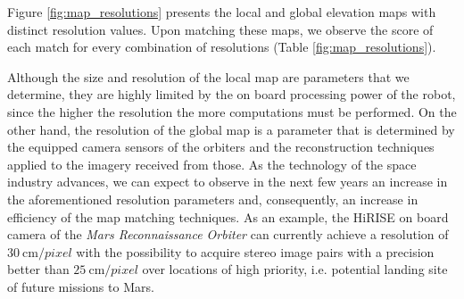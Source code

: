 Figure \ref{fig:map_resolutions} presents the local and global elevation
maps with distinct resolution values.
Upon matching these maps, we observe the score of each match for every
combination of resolutions (Table \ref{fig:map_resolutions}).

Although the size and resolution of the local map are parameters that we
determine, they are highly limited by the on board processing power of the
robot, since the higher the resolution the more computations must be performed.
On the other hand, the resolution of the global map is a parameter that is
determined by the equipped camera sensors of the orbiters and the
reconstruction techniques applied to the imagery received from those.
As the technology of the space industry advances, we can expect to observe
in the next few years an increase in the aforementioned resolution parameters
and, consequently, an increase in efficiency of the map matching techniques.
As an example, the HiRISE on board camera of the
\textit{Mars Reconnaissance Orbiter} can currently achieve a resolution of
$\SI{30}{\cm \per pixel}$ with the possibility to acquire stereo image pairs
with a precision better than $\SI{25}{\cm \per pixel}$ over locations of
high priority, i.e. potential landing site of future missions to Mars.

